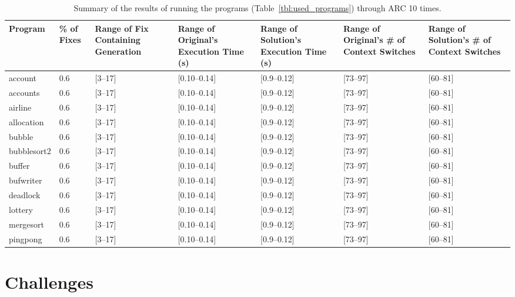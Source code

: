 \documentclass{llncs}
\begin{document}
\begin{table}[!t]
\caption{Summary of the results of running the programs
(Table~\ref{tbl:used_programs}) through ARC 10 times.}
\begin{center}
\begin{tabular}{|p{2cm}|p{0.6cm}|p{1.75cm}|p{2cm}|p{2cm}|p{2cm}|p{2cm}|}
\hline
\textbf{Program} & \textbf{\% of Fixes} & \textbf{Range of Fix Containing Generation} & \textbf{Range of Original's Execution Time (s)} & \textbf{Range of Solution's Execution Time (s)} & \textbf{Range of Original's \# of Context Switches} & \textbf{Range of Solution's \# of Context Switches}\\
\hline
account & 0.6 & [3--17] & [0.10--0.14] & [0.9--0.12] & [73--97] & [60--81]\\
\hline
accounts & 0.6 & [3--17] & [0.10--0.14] & [0.9--0.12] & [73--97] & [60--81]\\
\hline
airline & 0.6 & [3--17] & [0.10--0.14] & [0.9--0.12] & [73--97] & [60--81]\\
\hline
allocation & 0.6 & [3--17] & [0.10--0.14] & [0.9--0.12] & [73--97] & [60--81]\\
\hline
bubble & 0.6 & [3--17] & [0.10--0.14] & [0.9--0.12] & [73--97] & [60--81]\\
\hline
bubblesort2 & 0.6 & [3--17] & [0.10--0.14] & [0.9--0.12] & [73--97] & [60--81]\\
\hline
buffer & 0.6 & [3--17] & [0.10--0.14] & [0.9--0.12] & [73--97] & [60--81]\\
\hline
bufwriter & 0.6 & [3--17] & [0.10--0.14] & [0.9--0.12] & [73--97] & [60--81]\\
\hline
deadlock & 0.6 & [3--17] & [0.10--0.14] & [0.9--0.12] & [73--97] & [60--81]\\
\hline
lottery & 0.6 & [3--17] & [0.10--0.14] & [0.9--0.12] & [73--97] & [60--81]\\
\hline
mergesort & 0.6 & [3--17] & [0.10--0.14] & [0.9--0.12] & [73--97] & [60--81]\\
\hline
pingpong & 0.6 & [3--17] & [0.10--0.14] & [0.9--0.12] & [73--97] & [60--81]\\
\hline
\end{tabular}
\label{tbl:summary_results}
\end{center}
\end{table}


\section{Challenges}
\label{sec:challenges}
\end{document}

